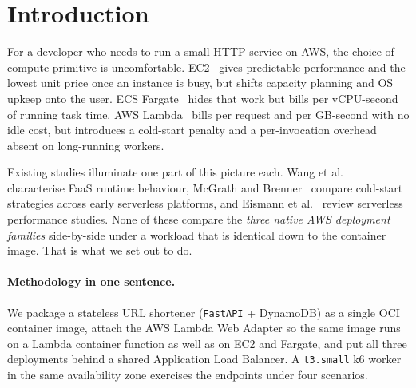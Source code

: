 \section{Introduction}
\label{sec:intro}

For a developer who needs to run a small HTTP service on AWS, the
choice of compute primitive is uncomfortable. EC2~\cite{aws-ec2} gives
predictable performance and the lowest unit price once an instance is
busy, but shifts capacity planning and OS upkeep onto the user.  ECS
Fargate~\cite{aws-fargate} hides that work but bills per vCPU-second of
running task time. AWS Lambda~\cite{aws-lambda} bills per request and
per GB-second with no idle cost, but introduces a cold-start penalty
and a per-invocation overhead absent on long-running workers.

Existing studies illuminate one part of this picture each.
Wang et al.~\cite{peeking-serverless} characterise FaaS runtime behaviour,
McGrath and Brenner~\cite{mcgrath-faas} compare cold-start strategies
across early serverless platforms, and Eismann
et al.~\cite{eismann2021review} review serverless performance studies.
None of these compare the \emph{three native AWS deployment
families} side-by-side under a workload that is identical down to the
container image. That is what we set out to do.

\paragraph{Methodology in one sentence.} We package a stateless URL
shortener (\texttt{FastAPI} + DynamoDB) as a single OCI container image,
attach the AWS Lambda Web Adapter so the same image runs on a Lambda
container function as well as on EC2 and Fargate, and put all three
deployments behind a shared Application Load Balancer. A
\texttt{t3.small} k6 worker in the same availability zone exercises the
endpoints under four scenarios.

